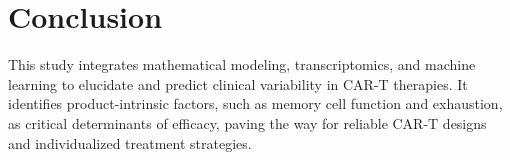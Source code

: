 \documentclass[12pt]{article}
\begin{document}
\section*{Conclusion}
This study integrates mathematical modeling, transcriptomics, and machine learning to elucidate and predict clinical variability in CAR-T therapies. It identifies product-intrinsic factors, such as memory cell function and exhaustion, as critical determinants of efficacy, paving the way for reliable CAR-T designs and individualized treatment strategies.
\end{document}
